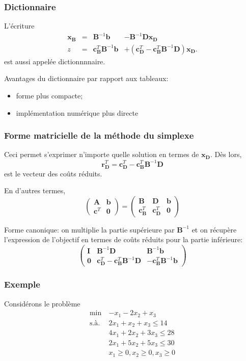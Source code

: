 \documentclass[usepdftitle=false]{beamer}
\def\bb{\boldsymbol{b}}
\def\bc{\boldsymbol{c}}
\def\br{\boldsymbol{r}}
\def\bx{\boldsymbol{x}}
\def\bA{\boldsymbol{A}}
\def\bB{\boldsymbol{B}}
\def\bD{\boldsymbol{D}}
\def\bI{\boldsymbol{I}}
\def\bzero{\boldsymbol{0}}
\begin{document}
\begin{frame}
\frametitle{Dictionnaire}

L'écriture
$$
\begin{matrix}
  \bx_{\bB} & = & \bB^{-1} \bb & - \bB^{-1}\bD\bx_{\bD} \\
\hline
z & = & \bc_{\bB}^T \bB^{-1} \bb & + \left( \bc_{\bD}^T - \bc_{\bB}^T \bB^{-1} \bD \right) \bx_{\bD}. 
\end{matrix}
$$
est aussi appelée {\color{red} dictionnnnaire}.

\mbox{}

Avantages du dictionnaire par rapport aux tableaux:
\begin{itemize}
	\item forme plus compacte;
	\item implémentation numérique plus directe
\end{itemize}

\end{frame}

\begin{frame}
\frametitle{Forme matricielle de la méthode du simplexe}

Ceci permet s'exprimer n'importe quelle solution en termes de $\bx_{\bD}$. Dès lors,
\[
\br_{\bD}^T = \bc_{\bD}^T - \bc_{\bB}^T \bB^{-1} \bD
\]
est le vecteur des coûts réduits.

\mbox{}

En d'autres termes,
\[
\begin{pmatrix}
\bA & \bb \\
\bc^T & \bzero
\end{pmatrix}
=
\begin{pmatrix}
\bB & \bD & \bb \\
\bc_{\bB}^T & \bc_{\bD}^T & \bzero
\end{pmatrix}
\]

\mbox{}

Forme canonique: on multiplie la partie supérieure par $\bB^{-1}$ et on récupère l'expression de l'objectif en termes de coûts réduits pour la partie inférieure:
\[
\begin{pmatrix}
\bI & \bB^{-1}\bD & \bB^{-1}\bb \\
\bzero & \bc_{\bD}^T - \bc_{\bB}^T \bB^{-1} \bD
& -\bc_{\bB}^T \bB^{-1} \bb
\end{pmatrix}
\]
\end{frame}

\begin{frame}
\frametitle{Exemple}

Considérons le problème
\begin{align*}
\min\ & - x_1 - 2x_2 + x_3 \\
\mbox{s.à. } & 2x_1 + x_2 + x_3 \leq 14 \\
& 4x_1 + 2x_2 + 3x_3 \leq 28 \\
& 2x_1 + 5x_2 + 5x_3 \leq 30 \\
& x_1 \geq 0, x_2 \geq 0, x_3 \geq 0
\end{align*}

\end{frame}
\end{document}
